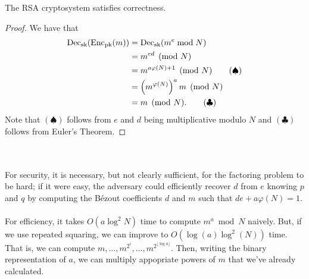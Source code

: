         \begin{lemma*}
            The RSA cryptosystem satisfies correctness.
            \begin{proof}
                We have that
                \begin{align*}
                    \operatorname{Dec}_{\operatorname{sk}}(\operatorname{Enc}_{\operatorname{pk}}(m))&=\operatorname{Dec}_{\operatorname{sk}}(m^e\bmod N) \\
                    &=m^{ed}\pmod{N} \\
                    &=m^{a\varphi(N)+1}\pmod{N} \tag{\(\spadesuit\)} \\
                    &=\left(m^{\varphi(N)}\right)^am\pmod{N} \\
                    &=m\pmod{N}. \tag{\(\clubsuit\)}
                \end{align*}
                Note that \((\spadesuit)\) follows from \(e\) and \(d\) being multiplicative modulo \(N\) and \((\clubsuit)\) follows from Euler's Theorem.
            \end{proof}
        \end{lemma*}
        \vphantom
        \\
        \\
        For security, it is necessary, but not clearly sufficient, for the factoring problem to be hard; if it were easy, the adversary could efficiently recover \(d\) from \(e\) knowing \(p\) and \(q\) by computing the B\'ezout coefficients \(d\) and \(m\) such that \(de+a\varphi(N)=1\).
        \\
        \\
        For efficiency, it takes \(O(a\log^2N)\) time to compute \(m^a\bmod N\) naively. But, if we use repeated squaring, we can improve to \(O(\log (a)\log^2(N))\) time. That is, we can compute \(m,\ldots,m^{2^i},\ldots,m^{2^{\lfloor \log a\rfloor}}\). Then, writing the binary representation of \(a\), we can multiply appopriate powers of \(m\) that we've already calculated. 